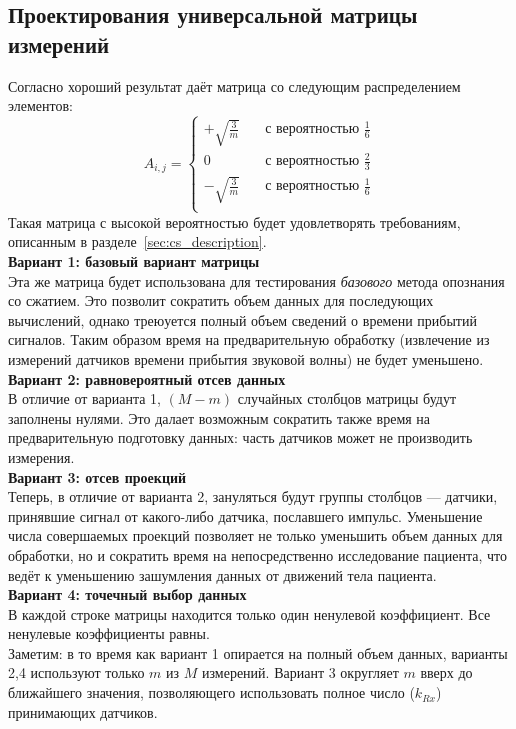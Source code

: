 \documentclass[14pt]{matmex-diploma}
\begin{document}
\subsection{Проектирования универсальной матрицы измерений}
Согласно \cite{baraniuk2008simple} хороший результат даёт матрица со следующим распределением элементов:
\[ A_{i,j} =
  \begin{cases}
    +\sqrt{\frac{3}{m}}      & \quad \text{с вероятностью } \frac{1}{6}\\
    0   & \quad \text{с вероятностью } \frac{2}{3}\\
    -\sqrt{\frac{3}{m}}       & \quad \text{с вероятностью } \frac{1}{6}\\
  \end{cases}
\]
Такая матрица с высокой вероятностью будет удовлетворять требованиям, описанным в разделе~\ref{sec:cs_description}.\\
\textbf{Вариант 1: базовый вариант матрицы}\\
Эта же матрица будет использована для тестирования \textit{базового} метода опознания со сжатием. Это позволит сократить объем данных для последующих вычислений, однако треюуется полный объем сведений о времени прибытий сигналов. Таким образом время на предварительную обработку (извлечение из измерений датчиков времени прибытия звуковой волны) не будет уменьшено.\\
\textbf{Вариант 2: равновероятный отсев данных}\\
В отличие от варианта 1, $(M-m)$ случайных столбцов матрицы будут заполнены нулями. Это далает возможным сократить также время на предварительную подготовку данных: часть датчиков может не производить измерения.\\
\textbf{Вариант 3: отсев проекций}\\
Теперь, в отличие от варианта 2, зануляться будут группы столбцов --- датчики, принявшие сигнал от какого-либо датчика, пославшего импульс. Уменьшение числа совершаемых проекций позволяет не только уменьшить объем данных для обработки, но и сократить время на непосредственно исследование пациента, что ведёт к уменьшению зашумления данных от движений тела пациента. \\
\textbf{Вариант 4: точечный выбор данных}\\
В каждой строке матрицы находится только один ненулевой коэффициент. Все ненулевые коэффициенты равны. \\

Заметим: в то время как вариант 1 опирается на полный объем данных, варианты 2,4 используют только $m \text{ из } M$ измерений. Вариант 3 округляет $m$ вверх до ближайшего значения, позволяющего использовать полное число ($k_{Rx}$) принимающих датчиков.
\end{document}
